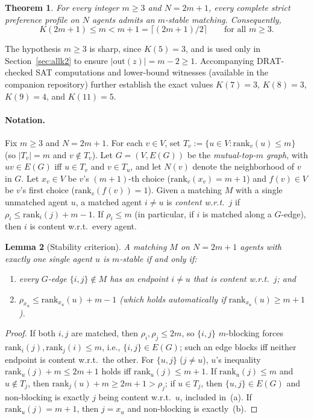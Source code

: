 \documentclass[11pt]{article}
\newtheorem{theorem}{Theorem}
\newtheorem{lemma}[theorem]{Lemma}
\begin{document}
\begin{theorem}\label{thm:main}
For every integer $m \ge 3$ and $N = 2m + 1$, every complete strict preference profile on $N$ agents admits an $m$-stable matching. Consequently,
\[
K(2m+1) \le m < m + 1 = \lceil (2m+1)/2 \rceil \qquad \text{for all } m \ge 3.
\]
\end{theorem}

The hypothesis $m \ge 3$ is sharp, since $K(5) = 3$, and is used only in Section~\ref{sec:allk2} to ensure $|\mathrm{out}(z)| = m - 2 \ge 1$. Accompanying DRAT-checked SAT computations and lower-bound witnesses (available in the companion repository) further establish the exact values $K(7)=3$, $K(8)=3$, $K(9)=4$, and $K(11)=5$.

\paragraph{Notation.} Fix $m \ge 3$ and $N = 2m+1$. For each $v \in V$, set $T_v := \{u \in V : \mathrm{rank}_v(u) \le m\}$ (so $|T_v| = m$ and $v \notin T_v$). Let $G = (V, E(G))$ be the \emph{mutual-top-$m$ graph}, with $uv \in E(G)$ iff $u \in T_v$ and $v \in T_u$, and let $N(v)$ denote the neighborhood of $v$ in $G$. Let $x_v \in V$ be $v$'s $(m+1)$-th choice ($\mathrm{rank}_v(x_v) = m+1$) and $f(v) \in V$ be $v$'s first choice ($\mathrm{rank}_v(f(v)) = 1$). Given a matching $M$ with a single unmatched agent $u$, a matched agent $i \neq u$ is \emph{content w.r.t.\ $j$} if $\rho_i \le \mathrm{rank}_i(j) + m - 1$. If $\rho_i \le m$ (in particular, if $i$ is matched along a $G$-edge), then $i$ is content w.r.t.\ every agent.

\begin{lemma}[Stability criterion]\label{lem:crit}
A matching $M$ on $N = 2m+1$ agents with exactly one single agent $u$ is $m$-stable if and only if:
\begin{enumerate}
  \item[(a)] every $G$-edge $\{i,j\} \notin M$ has an endpoint $i \neq u$ that is content w.r.t.\ $j$; and
  \item[(b)] $\rho_{x_u} \le \mathrm{rank}_{x_u}(u) + m - 1$ (which holds automatically if $\mathrm{rank}_{x_u}(u) \ge m+1$).
\end{enumerate}
\end{lemma}

\begin{proof}
If both $i,j$ are matched, then $\rho_i, \rho_j \le 2m$, so $\{i,j\}$ $m$-blocking forces $\mathrm{rank}_i(j), \mathrm{rank}_j(i) \le m$, i.e., $\{i,j\} \in E(G)$; such an edge blocks iff neither endpoint is content w.r.t.\ the other. For $\{u,j\}$ ($j \neq u$), $u$'s inequality $\mathrm{rank}_u(j) + m \le 2m+1$ holds iff $\mathrm{rank}_u(j) \le m+1$. If $\mathrm{rank}_u(j) \le m$ and $u \notin T_j$, then $\mathrm{rank}_j(u) + m \ge 2m+1 > \rho_j$; if $u \in T_j$, then $\{u,j\} \in E(G)$ and non-blocking is exactly $j$ being content w.r.t.\ $u$, included in~(a). If $\mathrm{rank}_u(j) = m+1$, then $j = x_u$ and non-blocking is exactly~(b).
\end{proof}
\end{document}
